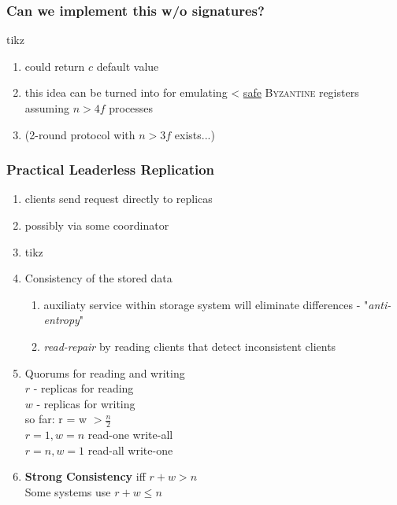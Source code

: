 \documentclass{article}
\begin{document}
\begin{adjustwidth}{2em}{2em}
\begin{adjustwidth}{2em}{2em}
			\subsubsection{Can we implement this w/o signatures?}
			\begin{adjustwidth}{2em}{}
				tikz \\
				\begin{enumerate}[-]
					\item could return $c$ default value
					\item this idea can be turned into for emulating < \underline{safe} \textsc{Byzantine} registers assuming $n > 4f$ processes
					\item (2-round protocol with $n > 3f$ exists...)
				\end{enumerate}
			\end{adjustwidth}
			\subsubsection{Practical Leaderless Replication}
			\begin{adjustwidth}{2em}{}
				\begin{enumerate}[-]
					\item clients send request directly to replicas
					\item possibly via some coordinator
					\item tikz
					\item Consistency of the stored data
					\begin{enumerate}[\small{\textbullet}]
						\item auxiliaty service within storage system will eliminate differences - "\textit{anti-entropy}"
						\item \textit{read-repair} by reading clients that detect inconsistent clients
					\end{enumerate}
					\item Quorums for reading and writing \\
					$r$ - replicas for reading \\
					$w$ - replicas for writing \\
					so far: r = w $> \frac{n}{2}$ \\
					$r = 1, w = n$ read-one write-all \\
					$r = n, w = 1$ read-all write-one
					\item \textbf{Strong Consistency} iff $r+w>n$ \\
					Some systems use $r+w \leq n$
				\end{enumerate}
			\end{adjustwidth}
		\end{adjustwidth}

\end{adjustwidth}
\end{document}
